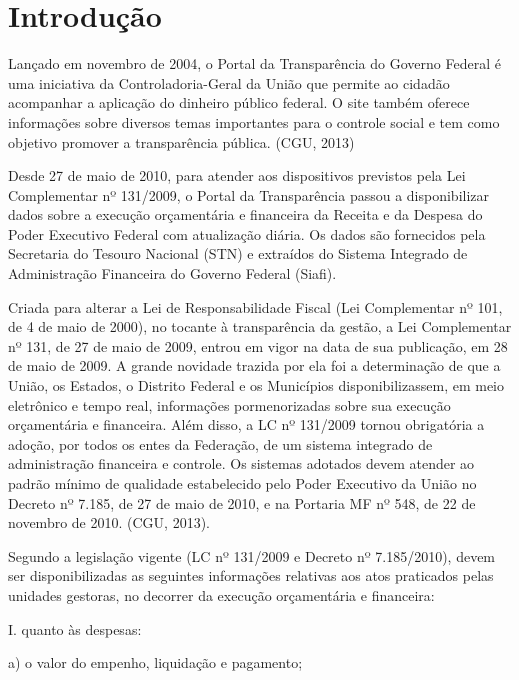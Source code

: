 
\chapter{Introdução}\label{intro}
Lançado em novembro de 2004, o Portal da Transparência do Governo Federal é uma iniciativa da Controladoria-Geral da União que permite ao cidadão acompanhar a aplicação do dinheiro público federal. O site também oferece informações sobre diversos temas importantes para o controle social e tem como objetivo promover a transparência pública. (CGU, 2013) 

Desde 27 de maio de 2010, para atender aos dispositivos previstos pela Lei Complementar nº 131/2009, o Portal da Transparência passou a disponibilizar dados sobre a execução orçamentária e financeira da Receita e da Despesa do Poder Executivo Federal com atualização diária. Os dados são fornecidos pela Secretaria do Tesouro Nacional (STN) e extraídos do Sistema Integrado de Administração Financeira do Governo Federal (Siafi). 

Criada para alterar a Lei de Responsabilidade Fiscal (Lei Complementar nº 101, de 4 de maio de 2000), no tocante à transparência da gestão, a Lei Complementar nº 131, de 27 de maio de 2009, entrou em vigor na data de sua publicação, em 28 de maio de 2009. A grande novidade trazida por ela foi a determinação de que a União, os Estados, o Distrito Federal e os Municípios disponibilizassem, em meio eletrônico e tempo real, informações pormenorizadas sobre sua execução orçamentária e financeira. Além disso, a LC nº 131/2009 tornou obrigatória a adoção, por todos os entes da Federação, de um sistema integrado de administração financeira e controle. Os sistemas adotados devem atender ao padrão mínimo de qualidade estabelecido pelo Poder Executivo da União no Decreto nº 7.185, de 27 de maio de 2010, e na Portaria MF nº 548, de 22 de novembro de 2010. (CGU, 2013). 

Segundo a legislação vigente (LC nº 131/2009 e Decreto nº 7.185/2010), devem ser disponibilizadas as seguintes informações relativas aos atos praticados pelas unidades gestoras, no decorrer da execução orçamentária e financeira:  

I. quanto às despesas:  

a) o valor do empenho, liquidação e pagamento;  


